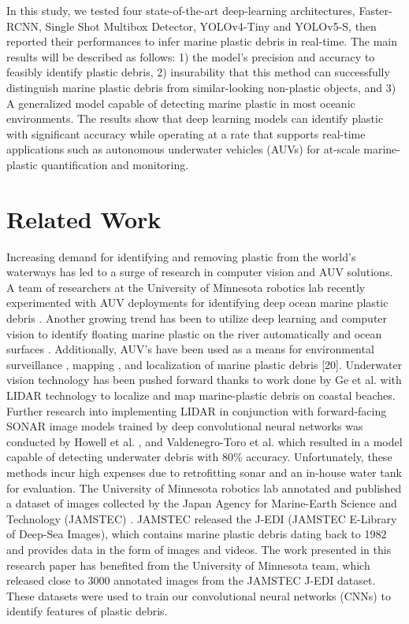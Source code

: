 \documentclass[a4paper,fleqn]{cas-dc}
\begin{document}
In this study, we tested four state-of-the-art deep-learning architectures, Faster-RCNN, Single Shot Multibox Detector, YOLOv4-Tiny and YOLOv5-S, then reported their performances to infer marine plastic debris in real-time. The main results will be described as follows: 1) the model’s precision and accuracy to feasibly identify plastic debris, 2) insurability that this method can successfully distinguish marine plastic debris from similar-looking non-plastic objects, and 3) A generalized model capable of detecting marine plastic in most oceanic environments. The results show that deep learning models can identify plastic with significant accuracy while operating at a rate that supports real-time applications such as autonomous underwater vehicles (AUVs) for at-scale marine- plastic quantification and monitoring.

\section{Related Work}
Increasing demand for identifying and removing plastic from the world’s waterways has led to a surge of research in computer vision and AUV solutions. A team of researchers at the University of Minnesota robotics lab recently experimented with AUV deployments for identifying deep ocean marine plastic debris \cite{fulton2018robotic}. Another growing trend has been to utilize deep learning and computer vision to identify floating marine plastic on the river automatically and ocean surfaces \cite{PANWAR2020100026}.
Additionally, AUV’s have been used as a means for environmental surveillance \cite{5509604}, mapping \cite{5603860}, and localization of marine plastic debris [20]. Underwater vision technology has been pushed forward thanks to work done by Ge et al. \cite{Ge_Shi_Mei_Dai_Li_2016} with LIDAR technology to localize and map marine-plastic debris on coastal beaches. Further research into implementing LIDAR in conjunction with forward-facing SONAR image models trained by deep convolutional neural networks was conducted by Howell et al. \cite{Kurz_Buckley_Howell_Schneider_2009}, and Valdenegro-Toro et al.
\cite{valdenegrotoro2019deep} which resulted in a model capable of detecting underwater debris with 80\% accuracy. Unfortunately, these methods incur high expenses due to retrofitting sonar and an in-house water tank for evaluation.
The University of Minnesota robotics lab \cite{fulton2018robotic} annotated and published a dataset of images collected by the Japan Agency for Marine-Earth Science and Technology (JAMSTEC) \cite{JAMSTEC}. JAMSTEC released the J-EDI (JAMSTEC E-Library of Deep-Sea Images), which contains marine plastic debris dating back to 1982 and provides data in the form of images and videos. The work presented in this research paper has benefited from the University of Minnesota team, which released close to 3000 annotated images from the JAMSTEC J-EDI dataset. These datasets were used to train our convolutional neural networks (CNNs) to identify features of plastic debris.
\end{document}
